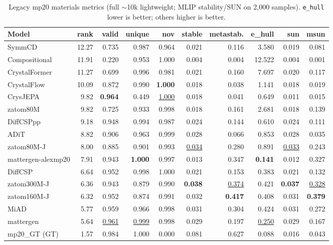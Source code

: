 \documentclass[11pt]{article}
\begin{document}
\begin{table}[H]
\centering
\scriptsize
\setlength{\tabcolsep}{4pt}
\caption{Legacy mp20 materials metrics (full $\sim$10k lightweight; MLIP stability/SUN on
2{,}000 samples). \texttt{e\_hull} lower is better; others higher is better.}
\label{tab:legacy_mp20}
\begin{tabular}{l r r r r r r r r r}
\toprule
Model & rank & valid & unique & nov & stable & metastab. & e\_hull & sun & msun \\
\midrule
SymmCD             & 12.27 & 0.735 & 0.987 & 0.964 & 0.021 & 0.116 & 3.580 & 0.019 & 0.081 \\
Compositional      & 11.91 & 0.220 & 0.953 & 1.000 & 0.004 & 0.004 & 12.522 & 0.004 & 0.001 \\
CrystalFormer      & 11.27 & 0.699 & 0.996 & 0.981 & 0.021 & 0.160 & 7.697 & 0.020 & 0.117 \\
CrystalFlow        & 10.09 & 0.872 & 0.990 & \textbf{1.000} & 0.018 & 0.038 & 1.141 & 0.018 & 0.019 \\
CrysJEPA           & 9.82  & \textbf{0.964} & 0.449 & \underline{1.000} & 0.018 & 0.041 & 0.649 & 0.011 & 0.015 \\
zatom80M           & 9.82  & 0.725 & 0.933 & 0.998 & 0.018 & 0.161 & 2.681 & 0.018 & 0.139 \\
DiffCSPpp          & 9.18  & 0.948 & 0.994 & 0.987 & 0.024 & 0.144 & 0.610 & 0.024 & 0.111 \\
ADiT               & 8.82  & 0.906 & 0.963 & 0.999 & 0.028 & 0.066 & 0.853 & 0.028 & 0.035 \\
zatom80M-J         & 8.00  & 0.885 & 0.901 & 0.993 & \underline{0.034} & 0.280 & 0.891 & \underline{0.033} & 0.243 \\
mattergen-alexmp20 & 7.91  & 0.943 & \textbf{1.000} & 0.997 & 0.013 & 0.347 & \textbf{0.141} & 0.012 & 0.327 \\
DiffCSP            & 6.64  & 0.952 & 0.998 & 1.000 & 0.021 & 0.153 & 0.383 & 0.021 & 0.132 \\
zatom300M-J        & 6.36  & 0.943 & 0.879 & 0.990 & \textbf{0.038} & \underline{0.374} & 0.421 & \textbf{0.037} & \underline{0.328} \\
zatom160M-J        & 6.32  & 0.952 & 0.874 & 0.991 & 0.032 & \textbf{0.417} & 0.408 & 0.031 & \textbf{0.379} \\
MiAD               & 5.77  & 0.959 & 0.966 & 0.998 & 0.031 & 0.304 & 0.424 & 0.031 & 0.272 \\
mattergen          & 5.64  & \underline{0.961} & \underline{0.999} & 0.998 & 0.029 & 0.197 & \underline{0.250} & 0.029 & 0.167 \\
\midrule
mp20\_GT (GT)      & 1.57  & 0.984 & 1.000 & 0.000 & 0.081 & 0.627 & 0.088 & 0.016 & 0.043 \\
\bottomrule
\end{tabular}
\end{table}
\end{document}
